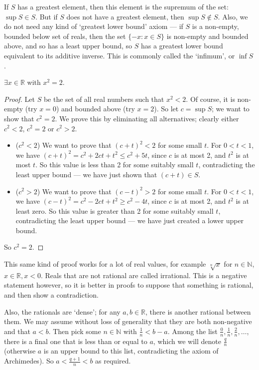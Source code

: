 \begin{remark}
	If \(S\) has a greatest element, then this element is the supremum of the set: \(\sup S \in S\).
	But if \(S\) does not have a greatest element, then \(\sup S \notin S\).
	Also, we do not need any kind of `greatest lower bound' axiom --- if \(S\) is a non-empty, bounded below set of reals, then the set \(\{ -x: x \in S \}\) is non-empty and bounded above, and so has a least upper bound, so \(S\) has a greatest lower bound equivalent to its additive inverse.
	This is commonly called the `infimum', or \(\inf S\).
\end{remark}
\begin{theorem}
	\(\exists x \in \mathbb R\) with \(x^2 = 2\).
\end{theorem}
\begin{proof}
	Let \(S\) be the set of all real numbers such that \(x^2 < 2\).
	Of course, it is non-empty (try \(x=0\)) and bounded above (try \(x=2\)).
	So let \(c = \sup S\); we want to show that \(c^2 = 2\).
	We prove this by eliminating all alternatives; clearly either \(c^2 < 2\), \(c^2 = 2\) or \(c^2 > 2\).
	\begin{itemize}
		\item (\(c^2 < 2\)) We want to prove that \((c+t)^2 < 2\) for some small \(t\).
		      For \(0<t<1\), we have \((c+t)^2 = c^2 + 2ct + t^2 \leq c^2 + 5t\), since \(c\) is at most 2, and \(t^2\) is at most \(t\).
		      So this value is less than 2 for some suitably small \(t\), contradicting the least upper bound --- we have just shown that \((c+t) \in S\).
		\item (\(c^2 > 2\)) We want to prove that \((c-t)^2 > 2\) for some small \(t\).
		      For \(0<t<1\), we have \((c-t)^2 = c^2 - 2ct + t^2 \geq c^2 - 4t\), since \(c\) is at most 2, and \(t^2\) is at least zero.
		      So this value is greater than 2 for some suitably small \(t\), contradicting the least upper bound --- we have just created a lower upper bound.
	\end{itemize}
	So \(c^2 = 2\).
\end{proof}
This same kind of proof works for a lot of real values, for example \(\sqrt[n]{x}\) for \(n \in \mathbb N\), \(x\in \mathbb R, x < 0\).
Reals that are not rational are called irrational.
This is a negative statement however, so it is better in proofs to suppose that something is rational, and then show a contradiction.

Also, the rationals are `dense'; for any \(a, b \in \mathbb R\), there is another rational between them.
We may assume without loss of generality that they are both non-negative and that \(a<b\).
Then pick some \(n \in \mathbb N\) with \(\frac{1}{n} < b-a\).
Among the list \(\frac{0}{n}, \frac{1}{n}, \frac{2}{n}, \dots\), there is a final one that is less than or equal to \(a\), which we will denote \(\frac{q}{n}\) (otherwise \(a\) is an upper bound to this list, contradicting the axiom of Archimedes).
So \(a < \frac{q + 1}{n} < b\) as required.

